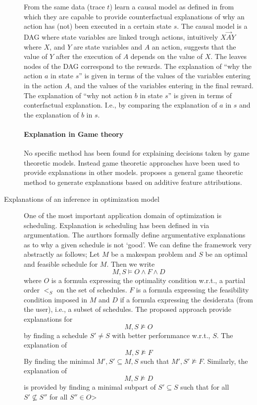 \begin{description}
    From the same data (trace $t$) \cite{madumal2019explainable} learn
    a causal model as defined in \cite{halpern2005causes1} from which
    they are capable to provide counterfactual explanations of why an
    action has (not) been executed in a certain state $s$.  The causal
    model is a DAG where state variables are linked trough actions,
    intuitively $X\stackrel{\rightarrow}{A} Y$ where $X$, and $Y$ are
    state variables and $A$ an action, suggests that the value of $Y$
    after the execution of $A$ depends on the value of $X$.  The
    leaves nodes of the DAG correspond to the rewards.  The
    explanation of ``why the action $a$ in state $s$'' is given in
    terms of the values of the variables entering in the action $A$,
    and the values of the variables entering in the final reward.  The
    explanation of ``why not action $b$ in state $s$'' is given in
    terms of conterfactual explanation. I.e., by comparing the
    explanation of $a$ in $s$ and the explanation of $b$ in $s$.
    
    \paragraph{Explanation in Game theory}
    No specific method has been found for explaining decisions taken by
    game theoretic models. Instead game theoretic approaches have been
    used to provide explanations in other models. 
    \cite{merrick2019explanation} proposes a general game theoretic
    method to generate explanations based on additive feature
    attributions.

  \item[Explanations of an inference in optimization model] One of the
    most important application domain of optimization is
    scheduling. Explanation is scheduling has been defined in
    \cite{vcyras2019argumentation} via argumentation.  The aurthors
    formally define argumentative explanations as to why a given
    schedule is not ‘good’. We can define the framework very
    abstractly as follows; Let $M$ be a makespan problem and $S$ be an
    optimal and feasible schedule for $M$. Then we write
    $$
    M,S \models O \wedge F \wedge D
    $$
    where $O$ is a formula expressing the optimality condition w.r.t.,
    a partial order $<_S$ on the set of schedules. 
    $F$ is a formula expressing the feasibility condition imposed in $M$
    and $D$ if a formula expressing the desiderata (from the user),
    i.e., a subset of schedules. 
    The proposed approach provide explanations for 
    $$
    M,S\not\models O 
    $$
    by finding a schedule $S'\neq S$ with better perfornmance w.r.t.,
    $S$.
    The explanation of 
    $$
    M,S\not\models F
    $$
    By finding the minimal $M',S'\subseteq M,S$ such that
    $M',S'\not\models F$. Similarly, the explanation of
    $$
    M,S\not\models D
    $$
    is provided by finding a minimal subpart of $S'\subseteq S$
    such that for all $S'\not\subseteq S''$ for all $S''\in O$> 


\end{description}
